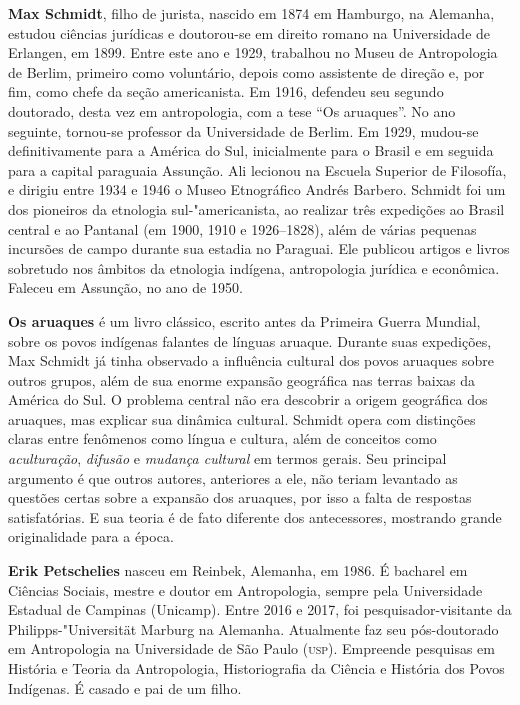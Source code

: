 \textbf{Max Schmidt}, filho de jurista, nascido em 1874 em Hamburgo, na Alemanha, estudou ciências jurídicas e doutorou-se em direito romano na Universidade de Erlangen, em 1899. Entre este ano e 1929, trabalhou no Museu de Antropologia de Berlim, primeiro como voluntário, depois como assistente de direção e, por fim, como chefe da seção americanista. Em 1916, defendeu seu segundo doutorado, desta vez em antropologia, com a tese ``Os aruaques''. No ano seguinte, tornou-se professor da Universidade de Berlim. Em 1929, mudou-se definitivamente para a América do Sul, inicialmente para o Brasil e em seguida para a capital paraguaia Assunção. Ali lecionou na Escuela Superior de Filosofía, e dirigiu entre 1934 e 1946 o Museo Etnográfico Andrés Barbero. Schmidt foi um dos pioneiros da etnologia sul-"americanista, ao realizar três expedições ao Brasil central e ao Pantanal (em 1900, 1910 e 1926--1828), além de várias pequenas incursões de campo durante sua estadia no Paraguai. Ele publicou artigos e livros sobretudo nos âmbitos da etnologia indígena, antropologia jurídica e econômica. Faleceu em Assunção, no ano de 1950.

\textbf{Os aruaques} é um livro clássico, escrito antes da Primeira Guerra Mundial, sobre os povos indígenas falantes de línguas aruaque. Durante suas expedições, Max Schmidt já tinha observado a influência cultural dos povos aruaques sobre outros grupos, além de sua enorme expansão geográfica nas terras baixas da América do Sul. O problema central não era descobrir a origem geográfica dos aruaques, mas explicar sua dinâmica cultural. Schmidt opera com distinções claras entre fenômenos como língua e cultura, além de conceitos como \textit{aculturação}, \textit{difusão} e \textit{mudança cultural} em termos gerais. Seu principal argumento é que outros autores, anteriores a ele, não teriam levantado as questões certas sobre a expansão dos aruaques, por isso a falta de respostas satisfatórias. E sua teoria é de fato diferente dos antecessores, mostrando grande originalidade para a época.

\pagebreak

\textbf{Erik Petschelies} nasceu em Reinbek, Alemanha, em 1986. É bacharel em Ciências Sociais, mestre e doutor em Antropologia, sempre pela Universidade Estadual de Campinas (Unicamp). Entre 2016 e 2017, foi pesquisador-visitante da Philipps-"Universität Marburg na Alemanha. Atualmente faz seu pós-doutorado em Antropologia na Universidade de São Paulo (\textsc{usp}). Empreende pesquisas em História e Teoria da Antropologia, Historiografia da Ciência e História dos Povos Indígenas. É casado e pai de um filho.

